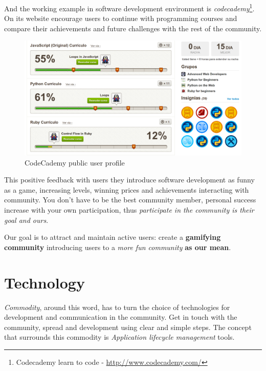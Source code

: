 \documentclass[11pt]{scrartcl}
\begin{document}
\par And the working example in software development environment is \emph{codecademy}\footnote{Codecademy learn to code - \url{http://www.codecademy.com/}}. On its website encourage users to continue with programming courses and compare their achievements and future challenges with the rest of the community.

\begin{figure}[H]
    \centering
    \includegraphics[width=1\textwidth]{codecademy-gamifying.png}
    \caption{CodeCademy public user profile}
    \label{codecademy-profile}
\end{figure}

\par This positive feedback with users they introduce software development as funny as a game, increasing levels, winning prices and achievements interacting with community. You don't have to be the best community member, personal success increase with your own participation, thus \emph{participate in the community is their goal and ours}.

\par Our goal is to attract and maintain active users: create a \textbf{gamifying community} introducing users to a \emph{more fun community} \textbf{as our mean}.


\section{Technology}
\label{sec:technology}

\par \emph{Commodity}, around this word, has to turn the choice of technologies for development and communication in the community. Get in touch with the community, spread and development using clear and simple steps. The concept that surrounds this commodity is \emph{Application lifecycle management} tools.
\end{document}
